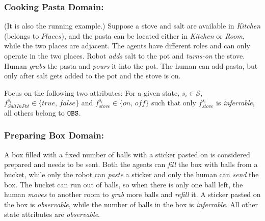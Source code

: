 \documentclass[letterpaper]{article} %
\begin{document}

\subsubsection{Cooking Pasta Domain:}
(It is also the running example.) Suppose a stove and salt are available in \textit{Kitchen} (belongs to $\textit{Places}$), and the pasta can be located either in \textit{Kitchen} or \textit{Room}, while the two places are adjacent. The agents have different roles and can only operate in the two places. Robot \textit{adds} salt to the pot and \textit{turns-on} the stove. Human \textit{grabs} the pasta and \textit{pours} it into the pot. 
The human can add pasta, but only after salt gets added to the pot and the stove is {\sc on}.

Focus on the following two attributes: For a given state, $s_i \in \mathcal{S}$, $f_{\textit{SaltInPot}}^{s_i} \in \{\textit{true, false}\}$ and $f_{\textit{stove}}^{s_i} \in \{\textit{on, off}\}$ such that only $f_{\textit{stove}}^{s_i}$ is \textit{inferrable}, all others belong to $\texttt{OBS}$.

\subsubsection{Preparing Box Domain:}
A box filled with a fixed number of balls with a sticker pasted on is considered prepared and needs to be sent. Both the agents can \textit{fill} the box with balls from a bucket, while only the robot can \textit{paste} a sticker and only the human can \textit{send} the box. The bucket can run out of balls, so when there is only one ball left, the human \textit{moves} to another room to \textit{grab} more balls and \textit{refill} it. A sticker pasted on the box is \textit{observable}, while the number of balls in the box is \textit{inferrable}. All other state attributes are \textit{observable}.   
\end{document}
